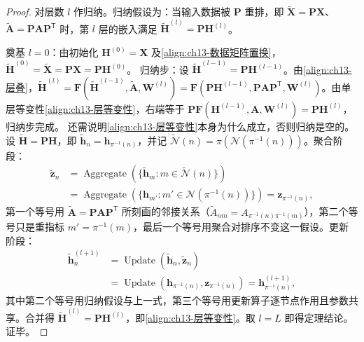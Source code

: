\documentclass[../../main.tex]{subfiles}
\begin{document}
\begin{proof}
对层数 $l$ 作归纳。归纳假设为：当输入数据被 $\bm{P}$ 重排，即 $\widetilde{\bm{X}}=\bm{P}\bm{X}$、$\widetilde{\bm{A}}=\bm{P}\bm{A}\bm{P}^{\mathsf T}$ 时，第 $l$ 层的嵌入满足 $\widetilde{\bm{H}}^{(l)}=\bm{P}\bm{H}^{(l)}$。\par
奠基 $l=0$：由初始化 $\bm{H}^{(0)}=\bm{X}$ 及\eqref{align:ch13-数据矩阵置换}，$\widetilde{\bm{H}}^{(0)}=\widetilde{\bm{X}}=\bm{P}\bm{X}=\bm{P}\bm{H}^{(0)}$。
归纳步：设 $\widetilde{\bm{H}}^{(l-1)}=\bm{P}\bm{H}^{(l-1)}$。由\eqref{align:ch13-层叠}，$\widetilde{\bm{H}}^{(l)}=\bm{F}(\widetilde{\bm{H}}^{(l-1)},\widetilde{\bm{A}},\bm{W}^{(l)})=\bm{F}(\bm{P}\bm{H}^{(l-1)},\bm{P}\bm{A}\bm{P}^{\mathsf T},\bm{W}^{(l)})$。由单层等变性\eqref{align:ch13-层等变性}，右端等于 $\bm{P}\bm{F}(\bm{H}^{(l-1)},\bm{A},\bm{W}^{(l)})=\bm{P}\bm{H}^{(l)}$，归纳步完成。
还需说明\eqref{align:ch13-层等变性}本身为什么成立，否则归纳是空的。设 $\widetilde{\bm{H}}=\bm{P}\bm{H}$，即 $\widetilde{\bm{h}}_n=\bm{h}_{\pi^{-1}(n)}$，并记 $\widetilde{\mathcal{N}}(n)=\pi(\mathcal{N}(\pi^{-1}(n)))$。聚合阶段：
\begin{align*}
\widetilde{\bm{z}}_n&=\operatorname{Aggregate}\left(\{\widetilde{\bm{h}}_m:m\in\widetilde{\mathcal{N}}(n)\}\right)\\
&=\operatorname{Aggregate}\left(\{\bm{h}_{m'}:m'\in\mathcal{N}(\pi^{-1}(n))\}\right)=\bm{z}_{\pi^{-1}(n)},
\end{align*}
第一个等号用 $\widetilde{\bm{A}}=\bm{P}\bm{A}\bm{P}^{\mathsf T}$ 所刻画的邻接关系（$\widetilde A_{nm}=A_{\pi^{-1}(n)\pi^{-1}(m)}$），第二个等号只是重指标 $m'=\pi^{-1}(m)$，最后一个等号用聚合对排序不变这一假设。更新阶段：
\begin{align*}
\widetilde{\bm{h}}_n^{(l+1)}&=\operatorname{Update}\left(\widetilde{\bm{h}}_n,\widetilde{\bm{z}}_n\right)\\
&=\operatorname{Update}\left(\bm{h}_{\pi^{-1}(n)},\bm{z}_{\pi^{-1}(n)}\right)=\bm{h}_{\pi^{-1}(n)}^{(l+1)},
\end{align*}
其中第二个等号用归纳假设与上一式，第三个等号用更新算子逐节点作用且参数共享。合并得 $\widetilde{\bm{H}}^{(l)}=\bm{P}\bm{H}^{(l)}$，即\eqref{align:ch13-层等变性}。取 $l=L$ 即得定理结论。证毕。
\end{proof}
\end{document}

